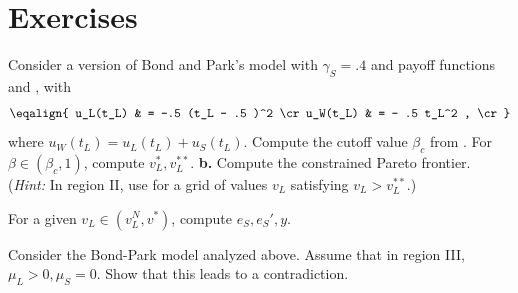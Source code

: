 \showchaptIDfalse
\showsectIDfalse
\section{Exercises}
\showchaptIDtrue
\showsectIDtrue
\medskip

\medskip
{}
\medskip
\noindent Consider a version of Bond and Park's model with
$\gamma_S=.4$ and  payoff functions   and
, with
$$\eqalign{ u_L(t_L)  &  = -.5 (t_L - .5 )^2  \cr
            u_W(t_L)  &  = - .5 t_L^2 ,    \cr}  $$
where $u_W(t_L) = u_L(t_L) + u_S(t_L)$.
\medskip
{} Compute the cutoff value $\beta_c$ from .
For $\beta \in (\beta_c,1)$, compute
$v_L^*, v_L^{**}$.
\medskip
\noindent
{\bf b.}  Compute the constrained Pareto frontier.  ({\it Hint:}  In
region II, use  for a grid of values
$v_L$ satisfying $v_L > v_L^{**}$.)

\medskip
{}  For a given $v_L \in (v_L^N, v^*)$,
compute $e_S, e_S', y$.


\medskip
{} \quad
\medskip
\noindent Consider the Bond-Park model
analyzed above.   Assume that in region III,  $\mu_L >0, \mu_S =0$.  Show
that this leads to a contradiction.
